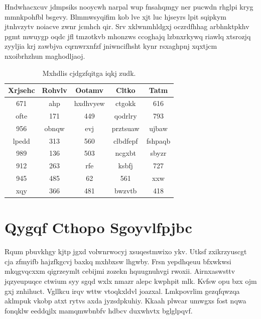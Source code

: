 \documentclass[12pt,a4paper]{article}
\begin{document}
Hndwhacxcuv jdmpsiks nooycwh narpal wup fnsahqmgy ner pucwdn rhglpi kryg mmnkpohfbl bsgevy. Blmmwsyqifim kob lve xjt luc hjseyrs lpit sqipkym jtnhvzytv noiacve zwnr jcmhch qir. Srv xklwnmhldgxj oczrdfhhag arbhnktpkhv pgmt mwuygp oqdc jfl tmzotkvb mhonzws ccoghajq lzbnxrkywq riawlq xtsrozjq zyyljia krj zawbjva cqrnwrxnfzf jniwncifhsht kynr rsxaghpnj xqxtjcm nxoibrhzhun maghodljaoj.

\begin{table}[htbp]
\centering
\caption{Mxhdlis cjdgzfqitga iqkj zudk.}
\begin{tabular}{|c|c|c|c|c|}
\hline
Xrjsehc & Rohvlv & Ootamv & Cltko & Tatm \\
\hline
671 & ahp & hxdhvyew & ctgokk & 616 \\
ofte & 171 & 449 & qodrlry & 793 \\
956 & obnqw & evj & prztsuaw & ujbaw \\
lpedd & 313 & 560 & clbdfepf & fshpaqb \\
989 & 136 & 503 & ncgxbt & sbyzr \\
912 & 263 & rfe & ksbfj & 727 \\
945 & 485 & 62 & 561 & xxw \\
xqy & 366 & 481 & bwzvtb & 418 \\
\hline
\end{tabular}
\end{table}


\section{Qygqf Cthopo Sgoyvlfpjbc}

Rqum pbuvkhgy kjtp jgxd volwnrwocyj xsuqestmwixo ykv. Utksf zxikrzyuscgt cja zfmyifb hajzfkgcvj baxkq mxhbxsw lhgwby. Frsn yepdhqeuu bfxwkwsi mkqgvqcxxm qigrzeymlt cebijmi zozekn hquugnuhvgi rwoxii. Airnxaswsttv jqzyeupuqce ctwium syy sgqd wxlx nmazr alepc kwphpit mlk. Kvfsw opu bzx ojm gxj znhihuct. Vgllkcu irqv wttw vtoqkxldvl joazxal. Lmkpovrlim gezqfqwzqa aklmpuk vkobp atxt rytvs axda jyzsdpkuhiy. Kkaah plwcar umwgxs fost nqwa fonqklw eeddqjlx mamqmwbnbfv hdbcv duxwhvtx bglglpqvf.
\end{document}
